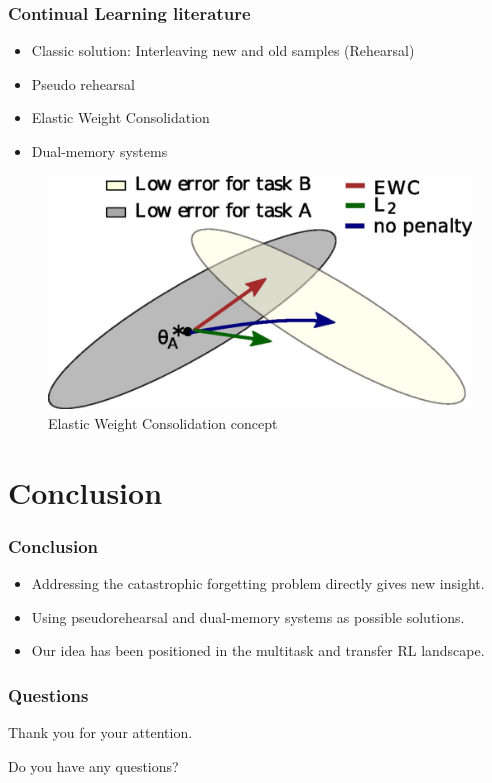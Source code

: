 \documentclass{beamer}
\theoremstyle{remark}
\theoremstyle{plain}
\begin{document}
\begin{frame}
 \frametitle{Continual Learning literature}
\begin{itemize}
    \item Classic solution: Interleaving new and old samples (Rehearsal)
    \item Pseudo rehearsal \cite{RobinsConsolidationBrain}
    \item Elastic Weight Consolidation \cite{Kirkpatrick2017OvercomingNetworks.}
    \item Dual-memory systems \cite{Parisi2018ContinualReview}
\end{itemize}
\begin{figure}
    \centering
    \includegraphics[scale=0.6]{figs/ewc.jpg}
    \caption{Elastic Weight Consolidation concept}
    \label{fig:my_label}
\end{figure}
  
\end{frame}


\section{Conclusion}
\label{sec:continual}
\begin{frame}
\frametitle{Conclusion}
\begin{itemize}
    \item Addressing the catastrophic forgetting problem directly gives new insight.
    \item Using pseudorehearsal and dual-memory systems as possible solutions.
    \item Our idea has been positioned in the multitask and transfer RL landscape.
\end{itemize}
\end{frame}



\begin{frame}
  \frametitle{Questions}
  \begin{center}
    Thank you for your attention.

    Do you have any questions?
  \end{center}
\end{frame}
\end{document}
